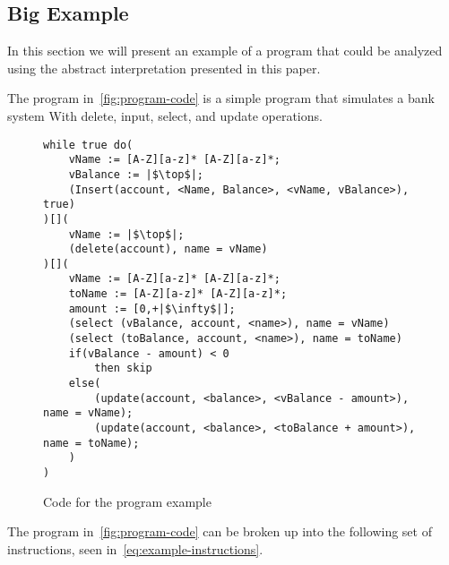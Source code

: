 \subsection{Big Example}\label{subsec:big-example}
In this section we will present an example of a program that could be analyzed using the abstract interpretation presented in this paper.

The program in~\autoref{fig:program-code} is a simple program that simulates a bank system With delete, input, select, and update operations.
\begin{figure}
    \begin{verbatim}
while true do(
    vName := [A-Z][a-z]* [A-Z][a-z]*;
    vBalance := |$\top$|;
    (Insert(account, <Name, Balance>, <vName, vBalance>), true)
)[](
    vName := |$\top$|;
    (delete(account), name = vName)
)[](
    vName := [A-Z][a-z]* [A-Z][a-z]*;
    toName := [A-Z][a-z]* [A-Z][a-z]*;
    amount := [0,+|$\infty$|];
    (select (vBalance, account, <name>), name = vName)
    (select (toBalance, account, <name>), name = toName)
    if(vBalance - amount) < 0
        then skip
    else(
        (update(account, <balance>, <vBalance - amount>), name = vName);
        (update(account, <balance>, <toBalance + amount>), name = toName);
    )
)
    \end{verbatim}
    \caption{Code for the program example}
    \label{fig:program-code}
\end{figure}

The program in~\autoref{fig:program-code} can be broken up into the following set of instructions, seen in~\autoref{eq:example-instructions}.

